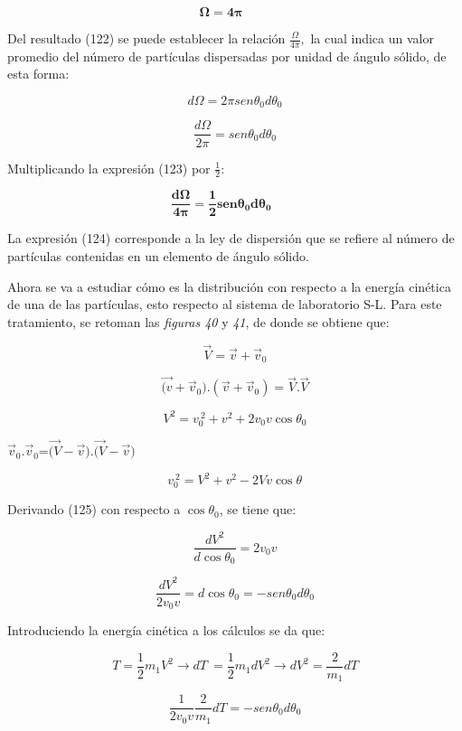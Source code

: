 \documentclass[]{article}
\begin{document}
\[\mathbf{\Omega}\mathbf{= 4}\mathbf{\pi\ \ \ \ \ \ \ \ \ \ }\]

Del resultado (122) se puede establecer la relación
\(\frac{\Omega}{4\pi},\) la cual indica un valor promedio del número de
partículas dispersadas por unidad de ángulo sólido, de esta forma:

\[d\Omega = 2\pi{sen}\theta_{0}d\theta_{0}\]

\[\frac{d\Omega}{2\pi} = {sen}\theta_{0}d\theta_{0}\]

Multiplicando la expresión (123) por \(\frac{1}{2}:\)

\[\frac{\mathbf{d}\mathbf{\Omega}}{\mathbf{4}\mathbf{\pi}}\mathbf{=}{\frac{\mathbf{1}}{\mathbf{2}}\mathbf{sen}}\mathbf{\theta}_{\mathbf{0}}\mathbf{d}\mathbf{\theta}_{\mathbf{0}}\mathbf{\ \ \ \ \ \ \ \ \ \ }\]

La expresión (124) corresponde a la ley de dispersión que se refiere al
número de partículas contenidas en un elemento de ángulo sólido.

Ahora se va a estudiar cómo es la distribución con respecto a la energía
cinética de una de las partículas, esto respecto al sistema de
laboratorio S-L. Para este tratamiento, se retoman las \emph{figuras 40}
y \emph{41}, de donde se obtiene que:

\[\overrightarrow{V} = \overrightarrow{v} + {\overrightarrow{v}}_{0}\]

\[\overrightarrow{(v} + {\overrightarrow{v}}_{0}).\left( \overrightarrow{v} + {\overrightarrow{v}}_{0} \right) = \overrightarrow{V}.\overrightarrow{V}\]

\[V^{2} = v_{0}^{\ 2} + v^{2} + 2v_{0}v\cos\theta_{0}\]

\({\overrightarrow{v}}_{0}.{\overrightarrow{v}}_{0}\)=\(\overrightarrow{(V} - \overrightarrow{v}).\overrightarrow{(V} - \overrightarrow{v})\)

\[v_{0}^{\ 2} = V^{2} + v^{2} - 2Vv\cos\theta_{}\]

Derivando (125) con respecto a \(\cos\theta_{0}\), se tiene que:

\[\frac{dV^{2}}{d\cos\theta_{0}} = 2v_{0}v\]

\[\frac{dV^{2}}{2v_{0}v} = d\cos\theta_{0} = - {sen}\theta_{0}d\theta_{0}\]

Introduciendo la energía cinética a los cálculos se da que:

\[T = \frac{1}{2}m_{1}V^{2} \rightarrow dT\  = \frac{1}{2}m_{1}dV^{2} \rightarrow dV^{2} = \frac{2}{m_{1}}dT\]

\[\frac{1}{2v_{0}v}\frac{2}{m_{1}}dT = - {sen}\theta_{0}d\theta_{0}\]
\end{document}
